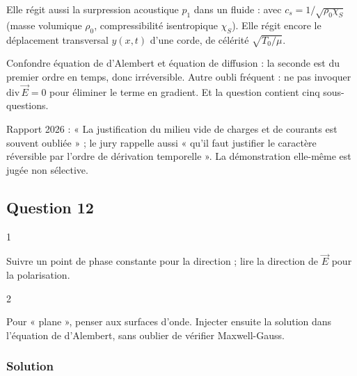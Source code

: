 \documentclass[11pt,a4paper]{article}
\newcommand{\equationajustee}[1]{%
  \sbox{\boiteequation}{$\displaystyle #1$}%
  \ifdim\wd\boiteequation>\linewidth
    \[\resizebox{\linewidth}{!}{\usebox{\boiteequation}}\]%
  \else
    \[#1\]%
  \fi}
\begin{document}
Elle régit aussi la surpression acoustique \(p_1\) dans un fluide :
\equationajustee{\Delta p_1-\frac{1}{c_s^2}\frac{\partial^2p_1}{\partial t^2}=0,}
avec \(c_s=1/\sqrt{\rho_0\chi_S}\) (masse volumique \(\rho_0\), compressibilité isentropique \(\chi_S\)). Elle régit encore le déplacement transversal \(y(x,t)\) d'une corde, de célérité \(\sqrt{T_0/\mu}\).

\begin{piege}

Confondre équation de d'Alembert et équation de diffusion : la seconde est du premier ordre en temps, donc irréversible. Autre oubli fréquent : ne pas invoquer \(\mathrm{div}\,\vec E=0\) pour éliminer le terme en gradient. Et la question contient cinq sous-questions.

\end{piege}

\begin{jury}

Rapport 2026 : « La justification du milieu vide de charges et de courants est souvent oubliée » ; le jury rappelle aussi « qu'il faut justifier le caractère réversible par l'ordre de dérivation temporelle ». La démonstration elle-même est jugée non sélective.

\end{jury}

\hypertarget{question-12}{%
\subsection{Question 12}\label{question-12}}

\begin{indication}{1}

Suivre un point de phase constante pour la direction ; lire la direction de \(\vec E\) pour la polarisation.

\end{indication}

\begin{indication}{2}

Pour « plane », penser aux surfaces d'onde. Injecter ensuite la solution dans l'équation de d'Alembert, sans oublier de vérifier Maxwell-Gauss.

\end{indication}

\hypertarget{solution-11}{%
\subsubsection{Solution}\label{solution-11}}
\end{document}
